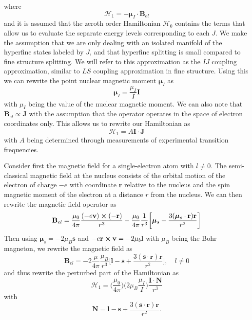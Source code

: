where
\begin{equation}
    \mathscr{H}_1 =-\boldsymbol{\mu}_I\cdot\mathbf{B}_{el}
\end{equation}
and it is assumed that the zeroth order Hamiltonian $\mathscr{H}_0$ contains the terms that allow us to evaluate the separate energy levels corresponding to each $J$. We make the assumption that we are only dealing with an isolated manifold of the hyperfine states labeled by $J$, and that hyperfine splitting is small compared to fine structure splitting. We will refer to this approximation as the $IJ$ coupling approximation, similar to $LS$ coupling approximation in fine structure. Using this we can rewrite the point nuclear magnetic moment \(\mathbf{\mu}_I\) as \cite{woodgate3}
\begin{equation}
    \boldsymbol{\mu}_I= \frac{\mu_I}{I}\mathbf{I}
\end{equation}
with \(\mu_I\) being the value of the nuclear magnetic moment. We can also note that \(\mathbf{B}_{el} \propto \mathbf{J}\) with the assumption that the operator operates in the space of electron coordinates only. This allows us to rewrite our Hamiltonian as
\begin{equation}
    \mathscr{H}_1=A \mathbf{I} \cdot \mathbf{J}
\end{equation}
with $A$ being determined through measurements of experimental transition frequencies.

Consider first the magnetic field for a single-electron atom with \( l\neq 0\). The semi-classical magnetic field at the nucleus consists of the orbital motion of the electron of charge $-e$ with coordinate \(\mathbf{r}\) relative to the nucleus and the spin magnetic moment of the electron at a distance $r$ from the nucleus. We can then rewrite the magnetic field operator as \cite{woodgate3}
\begin{equation}
    \mathbf{B}_{el}=\frac{\mu_0}{4\pi} \frac{(-e\mathbf{v})\cross (-\mathbf{r)}}{r^3} - \frac{\mu_0}{4\pi}\frac{1}{r^3}
    \bigg[\boldsymbol{\mu}_s -\frac{3(\boldsymbol{\mu}_s \cdot \mathbf{r})\mathbf{r}}{r^2}
    \bigg]
\end{equation}
Then using \(\boldsymbol{\mu}_s = -2\mu_B\mathbf{s}\) and \(-e\mathbf{r}\cross \mathbf{v} = -2\mu_b \mathbf{l}\) with $\mu_B$ being the Bohr magneton, we rewrite the magnetic field as
\begin{equation}
    \mathbf{B}_{el}= -2 \frac{\mu}{4\pi}\frac{\mu_B}{r^3}
    \bigg[\mathbf{l}-\mathbf{s}+\frac{3(\mathbf{s}\cdot \mathbf{r})\mathbf{r}}{r^2}
    \bigg],\quad l\neq 0
\end{equation}
and thus rewrite the perturbed part of the Hamiltonian as
\begin{equation}
    \mathscr{H}_1= \bigg(\frac{\mu_0}{4\pi}\bigg)\bigg(2\mu_B \frac{\mu_I}{I}\bigg)
    \frac{\mathbf{I}\cdot \mathbf{N}}{r^3}
\end{equation}
with 
\begin{equation}
    \mathbf{N}=\mathbf{l}-\mathbf{s}+\frac{3(\mathbf{s}\cdot \mathbf{r})\mathbf{r}}{r^2}.
\end{equation}

